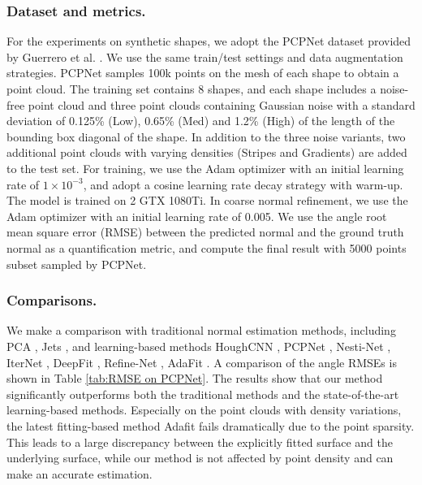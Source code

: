 \documentclass[letterpaper]{article} \usepackage{aaai23}  \usepackage{times}  \usepackage{helvet}  \usepackage{courier}  \usepackage[hyphens]{url}  \usepackage{graphicx} \urlstyle{rm} \def\UrlFont{\rm}  \usepackage{natbib}  \usepackage{caption} \frenchspacing  \setlength{\pdfpagewidth}{8.5in} \setlength{\pdfpageheight}{11in} \usepackage{algorithm}
\begin{document}
\subsubsection{Dataset and metrics.}
For the experiments on synthetic shapes, we adopt the PCPNet dataset provided by Guerrero et al. . We use the same train/test settings and data augmentation strategies. PCPNet samples 100k points on the mesh of each shape to obtain a point cloud. The training set contains 8 shapes, and each shape includes a noise-free point cloud and three point clouds containing Gaussian noise with a standard deviation of 0.125\% (Low), 0.65\% (Med) and 1.2\% (High) of the length of the bounding box diagonal of the shape. In addition to the three noise variants, two additional point clouds with varying densities (Stripes and Gradients) are added to the test set. For training, we use the Adam optimizer with an initial learning rate of $1\times10^{-3}$, and adopt a cosine learning rate decay strategy with warm-up. The model is trained on 2 GTX 1080Ti. In coarse normal refinement, we use the Adam optimizer with an initial learning rate of 0.005. We use the angle root mean square error (RMSE) between the predicted normal and the ground truth normal as a quantification metric, and compute the final result with 5000 points subset sampled by PCPNet.

\subsubsection{Comparisons.}
We make a comparison with traditional normal estimation methods, including PCA \cite{HoppeHugues1992SurfaceRF}, Jets  \cite{FrdricCazals2003EstimatingDQ}, and learning-based methods HoughCNN \cite{AlexandreBoulch2016DeepLF}, PCPNet  \cite{PaulGuerrero2017PCPNETLL}, Nesti-Net \cite{YizhakBenShabat2018NestiNetNE}, IterNet \cite{JanEricLenssen2019DeepIS}, DeepFit \cite{ben2020deepfit}, Refine-Net \cite{9693131}, AdaFit \cite{RunsongZhu2021AdaFitRL}. A comparison of the angle RMSEs is shown in Table \ref{tab:RMSE on PCPNet}. The results show that our method significantly outperforms both the traditional methods and the state-of-the-art learning-based methods. Especially on the point clouds with density variations, the latest fitting-based method Adafit fails dramatically due to the point sparsity. This leads to a large discrepancy between the explicitly fitted surface and the underlying surface, while our method is not affected by point density and can make an accurate estimation.
\end{document}
